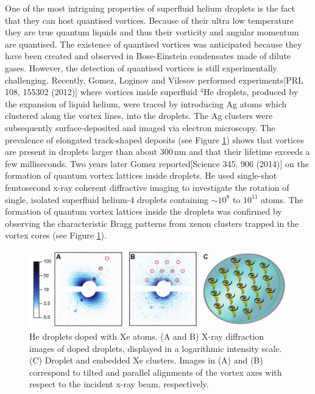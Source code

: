 \documentclass[12pt,a4paper,twosides]{book}
\newcommand{\unit}[1]{\,\mathrm{#1}}
\begin{document}
		One of the most intriguing properties of superfluid helium droplets is the fact that they can host quantised vortices. Because of their ultra low temperature they are true quantum liquids and thus their vorticity and angular momentum are quantised. The existence of quantised vortices was anticipated because they have been created and observed in Bose-Einstein condensates made of dilute gases. However, the detection of quantised vortices is still experimentally challenging. Recently, Gomez, Loginov and Vilesov performed experiments[PRL 108, 155302 (2012)] where vortices inside superfluid $^4$He droplets, produced by the expansion of liquid helium, were traced by introducing Ag atoms which clustered along the vortex lines, into the droplets. The Ag clusters were subsequently surface-deposited and imaged via electron microscopy. The prevalence of elongated track-shaped deposits (see Figure \ref{fig:vortex-array}) shows that vortices are present in droplets larger than about $300\unit{nm}$ and that their lifetime exceeds a few milliseconds. Two years later Gomez reported[Science 345, 906 (2014)] on the formation of quantum vortex lattices inside droplets. He used single-shot femtosecond x-ray coherent diffractive imaging to investigate the rotation of single, isolated superfluid helium-4 droplets containing $\sim\!10^8$ to $10^{11}$ atoms. The formation of quantum vortex lattices inside the droplets was confirmed by observing the characteristic Bragg patterns from xenon clusters trapped in the vortex cores (see Figure \ref{fig:vortex-array}).\\

		\begin{figure}[t]
			\begin{center}
				\includegraphics[width=\textwidth]{vortex-array}
				\caption{He droplets doped with Xe atoms. (A and B) X-ray diffraction images of doped droplets, displayed in a logarithmic intensity scale. (C) Droplet and embedded Xe clusters. Images in (A) and (B) correspond to tilted and parallel alignments of the vortex axes with respect to the incident x-ray beam, respectively.}
				\label{fig:vortex-array}
			\end{center}
		\end{figure}
				
\end{document}
